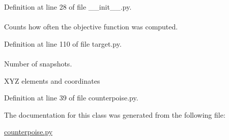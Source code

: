 \-Definition at line 28 of file \-\_\-\-\_\-init\-\_\-\-\_\-.\-py.

\hypertarget{classforcebalance_1_1target_1_1Target_ad4cd0ab38d8fc97d3e7a6e22ce130a16}{
\paragraph[{xct}]{}}\label{classforcebalance_1_1target_1_1Target_ad4cd0ab38d8fc97d3e7a6e22ce130a16}


\-Counts how often the objective function was computed. 



\-Definition at line 110 of file target.\-py.

\hypertarget{classforcebalance_1_1counterpoise_1_1Counterpoise_a1f1d1dea143c1e48971834d1c59ea1af}{
\paragraph[{xyzs}]{}}\label{classforcebalance_1_1counterpoise_1_1Counterpoise_a1f1d1dea143c1e48971834d1c59ea1af}


\-Number of snapshots. 

\-X\-Y\-Z elements and coordinates 

\-Definition at line 39 of file counterpoise.\-py.



\-The documentation for this class was generated from the following file\-:\begin{DoxyCompactItemize}
\item 
\hyperlink{counterpoise_8py}{counterpoise.\-py}\end{DoxyCompactItemize}
